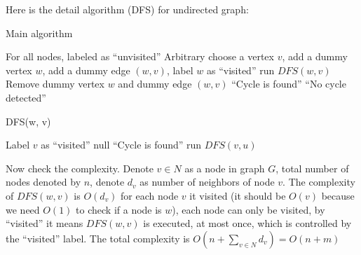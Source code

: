                     Here is the detail algorithm (DFS) for undirected graph:
                    \begin{algorithm}[H]
                        \caption{Main algorithm}
                        \begin{algorithmic}[1]
                            \State For all nodes, labeled as ``unvisited''
                            \State Arbitrary choose a vertex $v$, add a dummy vertex $w$, add a dummy edge $(w, v)$, label $w$ as ``visited''
                            \State run $DFS(w, v)$
                            \State Remove dummy vertex $w$ and dummy edge $(w, v)$
                                \State \Return ``Cycle is found''
                            \Else
                                \State \Return ``No cycle detected''
                            \EndIf
                        \end{algorithmic}
                    \end{algorithm}

                    \begin{algorithm}[H]
                        \caption{DFS(w, v)}
                        \begin{algorithmic}[1]
                            \State Label $v$ as ``visited''
                                \State \Return null
                            \Else
                                        \State \Return ``Cycle is found'' 
                                    \Else
                                        \State run $DFS(v, u)$
                                    \EndIf
                                \EndFor
                            \EndIf
                        \end{algorithmic}
                    \end{algorithm}

                    Now check the complexity. Denote $v\in N$ as a node in graph $G$, total number of nodes denoted by $n$, denote $d_v$ as number of neighbors of node $v$. The complexity of $DFS(w, v)$ is $O(d_v)$ for each node $v$ it visited (it should be $O(v)$ because we need $O(1)$ to check if a node is $w$), each node can only be visited, by ``visited'' it means $DFS(w, v)$ is executed, at most once, which is controlled by the ``visited'' label. The total complexity is $O(n + \sum_{v\in N} d_v) = O(n + m)$

